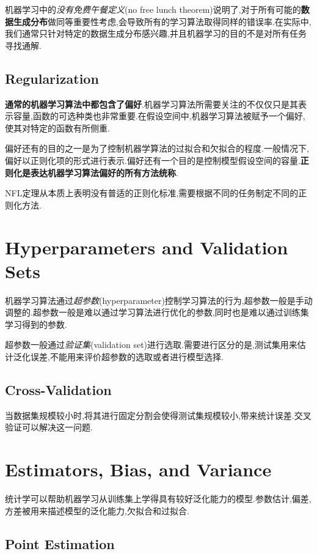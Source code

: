 机器学习中的\textit{没有免费午餐定义}(no free lunch theorem)说明了,对于所有可能的\textbf{数据生成分布}做同等重要性考虑,会导致所有的学习算法取得同样的错误率.在实际中,我们通常只针对特定的数据生成分布感兴趣,并且机器学习的目的不是对所有任务寻找通解.

\subsection{Regularization}

\textbf{通常的机器学习算法中都包含了偏好}.机器学习算法所需要关注的不仅仅只是其表示容量,函数的可选种类也非常重要.在假设空间中,机器学习算法被赋予一个偏好,使其对特定的函数有所侧重.

偏好还有的目的之一是为了控制机器学算法的过拟合和欠拟合的程度.一般情况下,偏好以正则化项的形式进行表示.偏好还有一个目的是控制模型假设空间的容量.\textbf{正则化是表达机器学习算法偏好的所有方法统称}.

NFL定理从本质上表明没有普适的正则化标准,需要根据不同的任务制定不同的正则化方法.

\section{Hyperparameters and Validation Sets}

机器学习算法通过\textit{超参数}(hyperparameter)控制学习算法的行为,超参数一般是手动调整的.超参数一般是难以通过学习算法进行优化的参数,同时也是难以通过训练集学习得到的参数.

超参数一般通过\textit{验证集}(validation set)进行选取.需要进行区分的是,测试集用来估计泛化误差,不能用来评价超参数的选取或者进行模型选择.

\subsection{Cross-Validation}

当数据集规模较小时,将其进行固定分割会使得测试集规模较小,带来统计误差.交叉验证可以解决这一问题.

\section{Estimators, Bias, and Variance}

统计学可以帮助机器学习从训练集上学得具有较好泛化能力的模型.参数估计,偏差,方差被用来描述模型的泛化能力,欠拟合和过拟合.

\subsection{Point Estimation}

